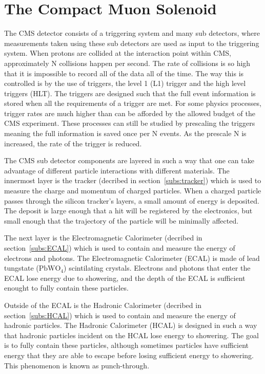\section{The Compact Muon Solenoid}
The CMS detector consists of a triggering system and many sub detectors,
where measurements taken using these sub detectors are used as input to the triggering system.
When protons are collided at the interaction point within CMS, approximately N collisions happen per second.
The rate of collisions is so high that it is impossible to record all of the data all of the time.
The way this is controlled is by the use of triggers, the level 1 (L1) trigger and the high level triggers (HLT).
The triggers are designed such that the full event information is stored when all the requirements of a trigger are met.
For some physics processes, trigger rates are much higher than can be afforded by the allowed budget of the CMS experiment.
These processes can still be studied by prescaling the triggers meaning the full information is saved once per N events.
As the prescale N is increased, the rate of the trigger is reduced.

The CMS sub detector components are layered in such a way that one can take advantage of different particle interactions with different materials.
The innermost layer is the tracker (decribed in section~\ref{subs:tracker}) which is used to measure the charge and momentum of charged particles.
When a charged particle passes through the silicon tracker's layers, a small amount of energy is deposited.
The deposit is large enough that a hit will be registered by the electronics, but small enough that the trajectory of the particle will be minimally affected.

The next layer is the Electromagnetic Calorimeter (decribed in section~\ref{subs:ECAL}) which is used to contain and measure the energy of electrons and photons.
The Electromagnetic Calorimeter (ECAL) is made of lead tungstate ($\mathrm{PbWO_{4}}$) scintilating crystals.
Electrons and photons that enter the ECAL lose energy due to showering, and the depth of the ECAL is sufficient enought to fully contain these particles.

Outside of the ECAL is the Hadronic Calorimeter (decribed in section~\ref{subs:HCAL}) which is used to contain and measure the energy of hadronic particles.
The Hadronic Calorimeter (HCAL) is designed in such a way that hadronic particles incident on the HCAL lose energy to showering.
The goal is to fully contain these particles, although sometimes particles have sufficient energy that they are able to escape before losing sufficient energy to showering.
This phenomenon is known as punch-through.

